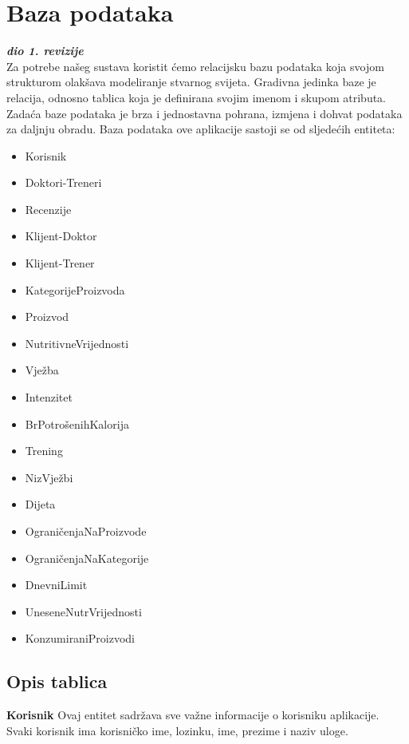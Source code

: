		\section{Baza podataka}
			
			\textbf{\textit{dio 1. revizije}}\\
			Za potrebe našeg sustava koristit ćemo relacijsku bazu podataka koja svojom strukturom olakšava modeliranje stvarnog svijeta. Gradivna jedinka baze je relacija, odnosno tablica koja je definirana svojim imenom i skupom atributa. Zadaća baze podataka je brza i jednostavna pohrana, izmjena i dohvat podataka za daljnju obradu.
			Baza podataka ove aplikacije sastoji se od sljedećih entiteta:
			\begin{itemize}
				\item {Korisnik}
				\item {Doktori-Treneri}
				\item {Recenzije}
				\item {Klijent-Doktor}
				\item {Klijent-Trener}
				\item {KategorijeProizvoda}
				\item {Proizvod}
				\item {NutritivneVrijednosti}
				\item {Vježba}
				\item {Intenzitet}
				\item {BrPotrošenihKalorija}
				\item {Trening}
				\item {NizVježbi}
				\item {Dijeta}
				\item {OgraničenjaNaProizvode}
				\item {OgraničenjaNaKategorije}
				\item {DnevniLimit}
				\item {UneseneNutrVrijednosti}
				\item {KonzumiraniProizvodi}
			\end{itemize}
			
			
		
			\subsection{Opis tablica}
			

				\textbf{Korisnik} Ovaj entitet sadržava sve važne informacije o korisniku aplikacije. Svaki korisnik ima korisničko ime, lozinku, ime, prezime i naziv uloge. 
				
